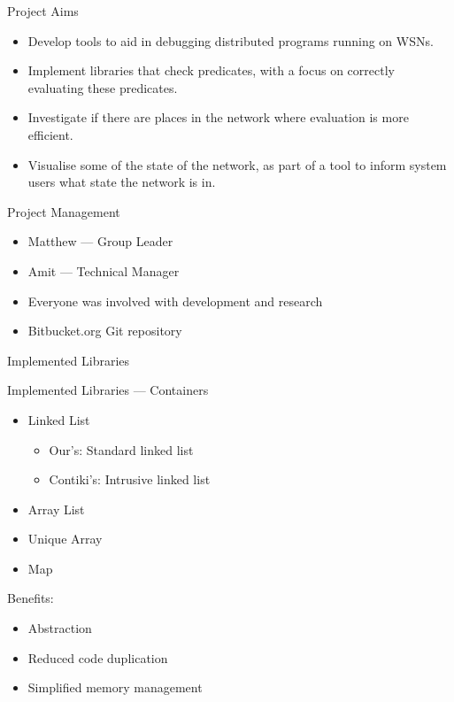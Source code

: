 \documentclass[usenames,dvipsnames]{beamer}
\newcommand{\subtitleframe}[1]{\begin{frame}\begin{block}{\centering\Large \vspace{1em} #1 \vspace{1em}}\end{block}\end{frame}}
\begin{document}
\begin{frame}{Project Aims}
	\begin{itemize}
		\item Develop tools to aid in debugging distributed programs running on WSNs.
		\item Implement libraries that check predicates, with a focus on correctly evaluating these predicates.
		\item Investigate if there are places in the network where evaluation is more efficient.
		\item Visualise some of the state of the network, as part of a tool to inform system users what state the network is in.
	\end{itemize}
\end{frame}

\begin{frame}{Project Management}
	\begin{itemize}
		\item Matthew --- Group Leader
		\item Amit --- Technical Manager
		\item Everyone was involved with development and research
		\item Bitbucket.org Git repository
	\end{itemize}
\end{frame}

\subtitleframe{Implemented Libraries}

\begin{frame}{Implemented Libraries --- Containers}
	\begin{itemize}
		\item Linked List
			\begin{itemize}
				\item Our's: Standard linked list
				\item Contiki's: Intrusive linked list
			\end{itemize}
		\item Array List
		\item Unique Array
		\item Map
	\end{itemize}
\vspace{1em}
Benefits:
	\begin{itemize}
		\item Abstraction
		\item Reduced code duplication
		\item Simplified memory management
	\end{itemize}
\end{frame}
\end{document}
